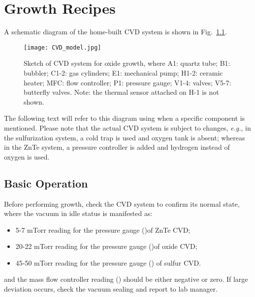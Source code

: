 \chapter{Growth Recipes}

A schematic diagram of the home-built CVD system is shown in Fig.~\ref{fig:ch2cvd}. 

\begin{figure}[htb]
\centering
\texttt{[image: CVD\_model.jpg]}
\caption{Sketch of CVD system for oxide growth, where A1: quartz tube; B1: bubbler; C1-2: gas cylinders; E1: mechanical pump; H1-2: ceramic heater; MFC: flow controller; P1: pressure gauge; V1-4: valves; V5-7: butterfly valves. Note: the thermal sensor attached on H-1 is not shown. }
\label{fig:ch2cvd}
\end{figure}

The following text will refer to this diagram using  when a specific component is mentioned. Please note that the actual CVD system is subject to changes, \emph{e.g.}, in the sulfurization system, a cold trap is used and oxygen tank is absent; whereas in the ZnTe system, a pressure controller is added and hydrogen instead of oxygen is used. 

\section{Basic Operation}
Before performing growth, check the CVD system to confirm its normal state, where the vacuum in idle status is manifested as:
\begin{itemize}
\item 5-7 mTorr reading for the pressure gauge ()of ZnTe CVD;
\item 20-22 mTorr reading for the pressure gauge ()of oxide CVD;
\item 45-50 mTorr reading for the pressure gauge () of sulfur CVD. 
\end{itemize} 
and the mass flow controller reading () should be either negative or zero. If large deviation occurs, check the vacuum sealing and report to lab manager. 

